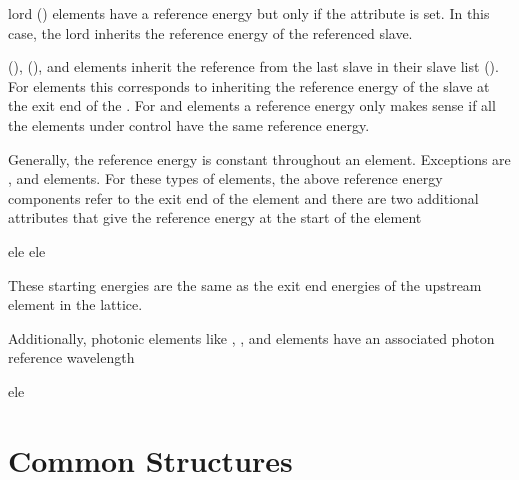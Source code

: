 {{{{{{{
 lord () elements have a
reference energy but only if the  attribute is set. In
this case, the  lord inherits the reference energy of
the referenced slave.

 (),  (), and
 elements inherit the reference from the last slave in
their slave list (). For  elements
this corresponds to inheriting the reference energy of the slave at
the exit end of the . For  and 
elements a reference energy only makes sense if all the elements under
control have the same reference energy.

Generally, the reference energy is constant throughout an
element. Exceptions are ,  and 
elements. For these types of elements, the above reference energy
components refer to the exit end of the element and there are two
additional attributes that give the reference energy at the start of
the element
\begin{example}
  ele%
  ele%
\end{example}
These starting energies are the same as the exit end energies of the upstream element in the lattice.

Additionally, photonic elements like , ,
 and  elements have an associated photon reference wavelength
\begin{example}
  ele%
\end{example}

\section{Common Structures}
\label{s:common.struct}


}}}}}}}
